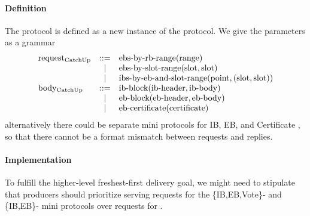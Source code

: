 \paragraph{Definition} The \catchup{} protocol is defined as a new instance of the \fetch{} protocol. We give the parameters as a grammar
\[
\begin{array}{l c l l}
\text{request}{}_{\text{CatchUp}{}} & ::= & \text{ebs-by-rb-range}(\text{range}{})\\
       & \mid  & \text{ebs-by-slot-range}(\text{slot}{},\text{slot}{})\\
       & \mid  & \text{ibs-by-eb-and-slot-range}(\text{point}{},(\text{slot}{},\text{slot}{}))\\
\text{body}{}_{\text{CatchUp}{}} & ::= & \text{ib-block}(\text{ib-header},\text{ib-body}) \\
        & \mid & \text{eb-block}(\text{eb-header}, \text{eb-body})\\
        & \mid & \text{eb-certificate}(\text{certificate})\\
\end{array}
\]
alternatively there could be separate mini protocols for IB, EB, and Certificate \catchup{}, so that there cannot be a format mismatch between requests and replies.

\paragraph{Implementation} To fulfill the higher-level freshest-first delivery goal, we might need to stipulate that producers should prioritize serving requests for the \{IB,EB,Vote\}-\relay{} and \{IB,EB\}-\fetch{} mini protocols over requests for \catchup{}.
